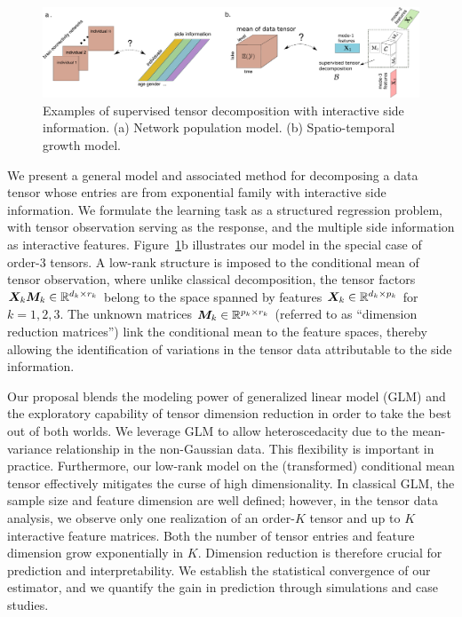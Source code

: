 \documentclass[12pt]{article}
\theoremstyle{definition}
\theoremstyle{definition}
\begin{document}
\begin{figure}[t]
\begin{center}
\includegraphics[width=16cm]{demo.pdf}
\vspace{-.5cm}
\end{center}
\caption{Examples of supervised tensor decomposition with interactive side information. (a) Network population model. (b) Spatio-temporal growth model.} \label{fig:intro1}
\vspace{-.3cm}
\end{figure}

We present a general model and associated method for decomposing a data tensor whose entries are from exponential family with interactive side information. We formulate the learning task as a structured regression problem, with tensor observation serving as the response, and the multiple side information as interactive features. Figure~\ref{fig:intro1}b illustrates our model in the special case of order-3 tensors. A low-rank structure is imposed to the conditional mean of tensor observation, where unlike classical decomposition, the tensor factors $\bm X_k\bm M_k\in\mathbb{R}^{d_k\times r_k}$ belong to the space spanned by features $\bm X_k\in\mathbb{R}^{d_k\times p_k}$ for $k=1,2,3$. The unknown matrices $\bm M_k\in\mathbb{R}^{p_k\times r_k}$ (referred to as ``dimension reduction matrices'') link the conditional mean to the feature spaces, thereby allowing the identification of variations in the tensor data attributable to the side information.


Our proposal blends the modeling power of generalized linear model (GLM) and the exploratory capability of tensor dimension reduction in order to take the best out of both worlds. We leverage GLM to allow heteroscedacity due to the mean-variance relationship in the non-Gaussian data. This flexibility is important in practice. Furthermore, our low-rank model on the (transformed) conditional mean tensor effectively mitigates the curse of high dimensionality. In classical GLM, the sample size and feature dimension are well defined; however, in the tensor data analysis, we observe only one realization of an order-$K$ tensor and up to $K$ interactive feature matrices. Both the number of tensor entries and feature dimension grow exponentially in $K$. Dimension reduction is therefore crucial for prediction and interpretability. We establish the statistical convergence of our estimator, and we quantify the gain in prediction through simulations and case studies. 
 
\end{document}
